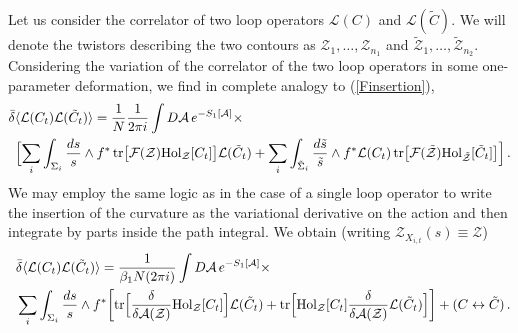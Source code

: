 \documentclass[12pt]{article}
\def \tr {\mathop{\rm tr}\nolimits}
\numberwithin{equation}{section}
\begin{document}
Let us consider the correlator of two loop operators $\mathcal{L}(C)$ and $\mathcal{L}(\tilde{C})$. We will denote the twistors describing the two contours as $\mathcal{Z}_1,\ldots,\mathcal{Z}_{n_1}$ and $\tilde{\mathcal{Z}}_1, \ldots, \tilde{\mathcal{Z}}_{n_2}$.
Considering the variation of the correlator of the two loop operators in some one-parameter deformation, we find in complete analogy to (\ref{Finsertion}),
\begin{align}
\label{FinsertionLL}
&\bar{\delta} \langle \mathcal{L}(C_t) \mathcal{L}(\tilde{C}_t)\rangle = \frac{1}{N} \frac{1}{2\pi i} \int D \mathcal{A} \,e^{-S_1[\mathcal{A}]} \times \\
&\,\,\,\Bigl[\sum_i \int_{\Sigma_i} \frac{ds}{s} \wedge  f^* \tr \bigl[ \mathcal{F}(\mathcal{Z}) {\rm Hol}_{\mathcal{Z}}[C_t]\bigr] \mathcal{L}(\tilde{C}_t) + \sum_i \int_{\tilde{\Sigma}_i} \frac{d\tilde{s}}{\tilde{s}} \wedge  f^* \mathcal{L}(C_t) \tr \bigl[ \mathcal{F}(\tilde{\mathcal{Z}}) {\rm Hol}_{\tilde{\mathcal{Z}}}[\tilde{C}_t]\bigr] \Bigr] \,. \notag
\end{align}
We may employ the same logic as in the case of a single loop operator to write the insertion of the curvature as the variational derivative on the action and then integrate by parts inside the path integral. We obtain (writing $\mathcal{Z}_{X_{i,t}}(s) \equiv \mathcal{Z}$)
\begin{align}
&\bar{\delta} \langle \mathcal{L}(C_t) \mathcal{L}(\tilde{C}_t)\rangle = \frac{1}{\beta_1 N (2 \pi i)} \int D \mathcal{A} \, e^{-S_1[\mathcal{A}]} \times \notag \\
\,\,\, &\sum_i \int_{\Sigma_i} \frac{ds}{s} \wedge  f^*  \biggl[\tr \Bigl[   \frac{\delta}{\delta \mathcal{A}(\mathcal{Z})}{\rm Hol}_{\mathcal{Z}}[C_t]\Bigr] \mathcal{L}(\tilde{C}_t) + \tr \Bigl[{\rm Hol}_{\mathcal{Z}}[C_t] \frac{\delta}{\delta \mathcal{A}(\mathcal{Z})} \mathcal{L}(\tilde{C}_t)\Bigr] \biggr] + (C \leftrightarrow \tilde{C})\,.
\label{deltabarLL}
\end{align}
\end{document}
